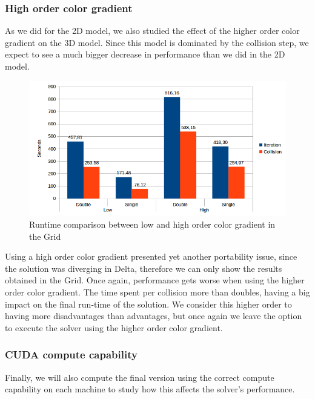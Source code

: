 \documentclass[12pt]{book}
\begin{document}
\subsubsection{High order color gradient}
As we did for the 2D model, we also studied the effect of the higher order color gradient on the 3D model. Since this model is dominated by the collision step, we expect to see a much bigger decrease in performance than we did in the 2D model.

  \begin{figure}[H]
  	\centering
  	\includegraphics[width=\linewidth]{Resources/Images/highgrid.png}
  	\caption{Runtime comparison between low and high order color gradient in the Grid}
  	\label{fig:highgrid}
  \end{figure}
  
  Using a high order color gradient presented yet another portability issue, since the solution was diverging in Delta, therefore we can only show the results obtained in the Grid. Once again, performance gets worse when using the higher order color gradient. The time spent per collision more than doubles, having a big impact on the final run-time of the solution. We consider this higher order to having more disadvantages than advantages, but once again we leave the option to execute the solver using the higher order color gradient.


\subsubsection{CUDA compute capability}
Finally, we will also compute the final version using the correct compute capability on each machine to study how this affects the solver's performance.
\end{document}
